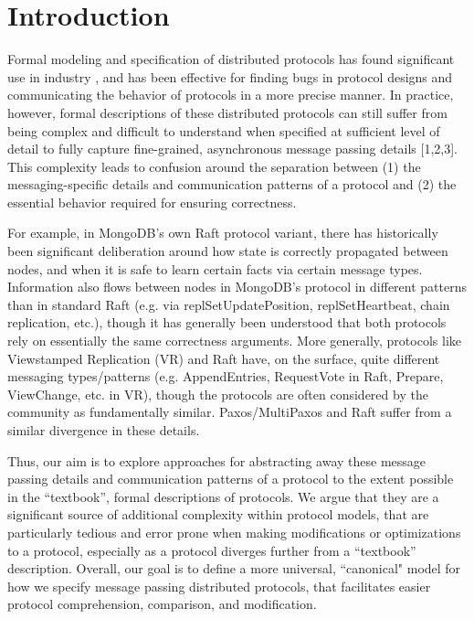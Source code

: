 \documentclass[acmsmall,screen,review]{acmart}
\begin{document}
\maketitle

\section{Introduction}

Formal modeling and specification of distributed protocols has found significant use in industry \cite{newcombe2014amazon,schultz2021formal}, and has been effective for finding bugs in protocol designs and communicating the behavior of protocols in a more precise manner. In practice, however, formal descriptions of these distributed protocols can still suffer from being complex and difficult to understand when specified at sufficient level of detail to fully capture fine-grained, asynchronous message passing details [1,2,3]. This complexity leads to confusion around the separation between (1) the messaging-specific details and communication patterns of a protocol and (2) the essential behavior required for ensuring correctness.

For example, in MongoDB’s own Raft protocol variant, there has historically been significant deliberation around how state is correctly propagated between nodes, and when it is safe to learn certain facts via certain message types. Information also flows between nodes in MongoDB’s protocol in different patterns than in standard Raft (e.g. via replSetUpdatePosition, replSetHeartbeat, chain replication, etc.), though it has generally been understood that both protocols rely on essentially the same correctness arguments. More generally, protocols like Viewstamped Replication (VR) and Raft have, on the surface, quite different messaging types/patterns (e.g. AppendEntries, RequestVote in Raft, Prepare, ViewChange, etc. in VR), though the protocols are often considered by the community as fundamentally similar. Paxos/MultiPaxos and Raft suffer from a similar divergence in these details. 

Thus, our aim is to explore approaches for abstracting away these message passing details and communication patterns of a protocol to the extent possible in the “textbook”, formal descriptions of protocols. We argue that they are a significant source of additional complexity within protocol models, that are particularly tedious and error prone when making modifications or optimizations to a protocol, especially as a protocol diverges further from a “textbook” description. Overall, our goal is to define a more universal, ``canonical" model for how we specify message passing distributed protocols, that facilitates easier protocol comprehension, comparison, and modification.
\end{document}

